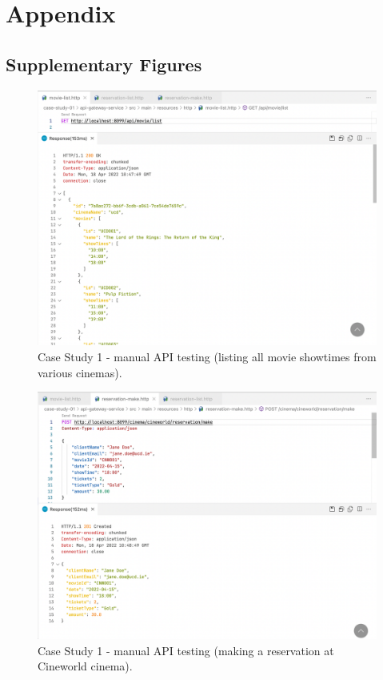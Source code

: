 \chapter{Appendix}

\section{Supplementary Figures}


\begin{figure}[H]
  \centering
  \includegraphics[width=1.0\linewidth]{./assets/images/case-studies/cs01-manual-1.png}
  \caption{Case Study 1 - manual API testing (listing all movie showtimes from various cinemas).}
  \label{fig:cs01-manual-1}
\end{figure}

\begin{figure}[H]
  \centering
  \includegraphics[width=1.0\linewidth]{./assets/images/case-studies/cs01-manual-2.png}
  \caption{Case Study 1 - manual API testing (making a reservation at Cineworld cinema).}
  \label{fig:cs01-manual-2}
\end{figure}

